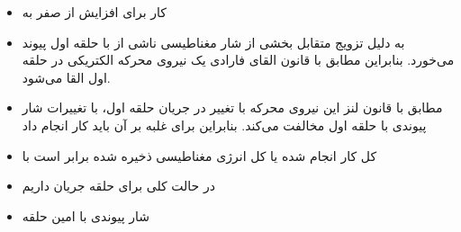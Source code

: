 \begin{ELunit}
\begin{itemize}
\begin{itemize}
    \begin{itemize}
    \tightlist
    \item
      کار  برای افزایش  از صفر به 
    \end{itemize}
  \end{itemize}
\end{itemize}


\begin{itemize}
\tightlist
\item
  به دلیل تزویج متقابل بخشی از شار مغناطیسی ناشی از  با حلقه اول پیوند می‌خورد. بنابراین مطابق با قانون القای فارادی یک نیروی محرکه الکتریکی در حلقه اول القا می‌شود.
\end{itemize}


\begin{itemize}
\tightlist
\item
  مطابق با قانون لنز این نیروی محرکه با تغییر در جریان حلقه اول، با تغییرات شار پیوندی با حلقه اول مخالفت می‌کند. بنابراین برای غلبه بر آن باید کار انجام داد
\end{itemize}


\begin{itemize}
\tightlist
\item
  کل کار انجام شده یا کل انرژی مغناطیسی ذخیره شده برابر است با
\end{itemize}


\begin{itemize}
\tightlist
\item
  در حالت کلی برای  حلقه جریان داریم
\end{itemize}


\begin{itemize}
\tightlist
\item
  شار پیوندی با امین حلقه
\end{itemize}


\end{ELunit}

